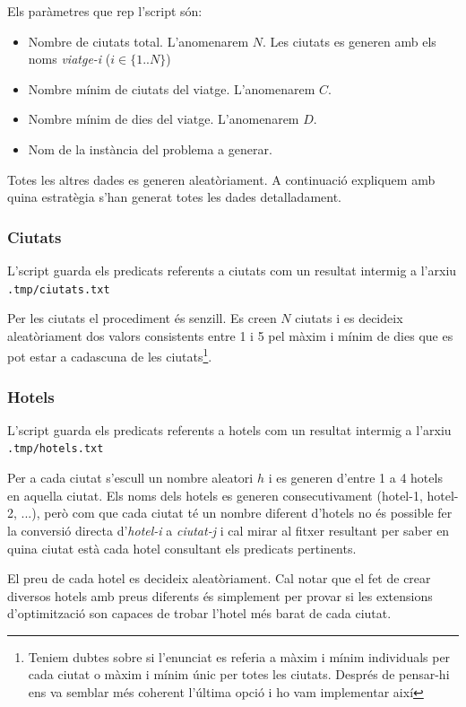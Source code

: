 \documentclass[11pt,a4paper]{article}
\begin{document}
Els paràmetres que rep l'script són:
\begin{itemize}
  \item{Nombre de ciutats total. L'anomenarem $N$. Les ciutats es generen amb els noms \emph{viatge-i} ($i \in \{1..N\}$) }
  \item{Nombre mínim de ciutats del viatge. L'anomenarem $C$.}
  \item{Nombre mínim de dies del viatge. L'anomenarem $D$.}
  \item{Nom de la instància del problema a generar.}
\end{itemize}

Totes les altres dades es generen aleatòriament. A continuació expliquem amb quina estratègia s'han generat totes les dades detalladament.

\subsubsection*{Ciutats}

L'script guarda els predicats referents a ciutats com un resultat intermig a l'arxiu \texttt{.tmp/ciutats.txt}

Per les ciutats el procediment és senzill. Es creen $N$ ciutats i es decideix aleatòriament dos valors consistents entre 1 i 5 pel màxim i mínim de dies que es pot estar a cadascuna de les ciutats\footnote{Teniem dubtes sobre si l'enunciat es referia a màxim i mínim individuals per cada ciutat o màxim i mínim únic per totes les ciutats. Després de pensar-hi ens va semblar més coherent l'última opció i ho vam implementar així}.

\subsubsection*{Hotels}

L'script guarda els predicats referents a hotels com un resultat intermig a l'arxiu \texttt{.tmp/hotels.txt}

Per a cada ciutat s'escull un nombre aleatori $h$ i es generen d'entre 1 a 4 hotels en aquella ciutat. Els noms dels hotels es generen consecutivament (hotel-1, hotel-2, ...), però com que cada ciutat té un nombre diferent d'hotels no és possible fer la conversió directa d'\emph{hotel-i} a \emph{ciutat-j} i cal mirar al fitxer resultant per saber en quina ciutat està cada hotel consultant els predicats pertinents.

El preu de cada hotel es decideix aleatòriament. Cal notar que el fet de crear diversos hotels amb preus diferents és simplement per provar si les extensions d'optimització son capaces de trobar l'hotel més barat de cada ciutat.
\end{document}
